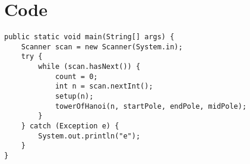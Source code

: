 \section{Code}

\begin{lstlisting}
public static void main(String[] args) {
    Scanner scan = new Scanner(System.in);
    try {
        while (scan.hasNext()) {
            count = 0;
            int n = scan.nextInt();
            setup(n);
            towerOfHanoi(n, startPole, endPole, midPole);
        }
    } catch (Exception e) {
        System.out.println("e");
    }
}
\end{lstlisting}